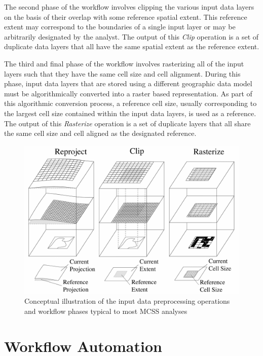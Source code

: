The second phase of the workflow involves clipping the various input data layers on the basis of their overlap with some reference spatial extent. This reference extent may correspond to the boundaries of a single input layer or may be arbitrarily designated by the analyst. The output of this \textit{Clip} operation is a set of duplicate data layers that all have the same spatial extent as the reference extent. 

The third and final phase of the workflow involves rasterizing all of the input layers such that they have the same cell size and cell alignment. During this phase, input data layers that are stored using a different geographic data model must be algorithmically converted into a raster based representation. As part of this algorithmic conversion process, a reference cell size, usually corresponding to the largest cell size contained within the input data layers, is used as a reference. The output of this \textit{Rasterize} operation is a set of duplicate layers that all share the same cell size and cell aligned as the designated reference.
    
        \begin{figure}[!h]
            \begin{center}
            \includegraphics[width=5.5in]{figures/data-processing-workflow.png}
             \caption{Conceptual illustration of the input data preprocessing operations and workflow phases typical to most MCSS analyses}
              \label{fig:Preprocessing}
              \end{center}
        \end{figure} 
        
\section{Workflow Automation}
    
